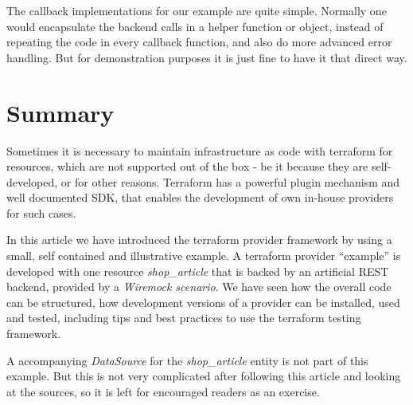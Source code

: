 \documentclass[paper=a4,11pt,numbers=noenddot]{article}
\begin{document}
The callback implementations for our example are quite simple. Normally one would encapsulate the backend calls in a helper function or object, instead of repeating the code in every callback function, and also do more advanced error handling. But for demonstration purposes it is just fine to have it that direct way.

\section{Summary}
\label{sec:summary}

Sometimes it is necessary to maintain infrastructure as code with terraform for resources, which are not supported out of the box - be it because they are self-developed, or for other reasons. Terraform has a powerful plugin mechanism and well documented SDK, that enables the development of own in-house providers for such cases.

In this article we have introduced the terraform provider framework by using a small, self contained and illustrative example. A terraform provider ``example'' is developed with one resource \emph{shop\_article} that is backed by an artificial REST backend, provided by a \emph{Wiremock scenario}. We have seen how the overall code can be structured, how development versions of a provider can be installed, used and tested, including tips and best practices to use the terraform testing framework.

A accompanying \emph{DataSource} for the \emph{shop\_article} entity is not part of this example. But this is not very complicated after following this article and looking at the sources, so it is left for encouraged readers as an exercise.

\printbibliography[heading=bibintoc]
\end{document}
